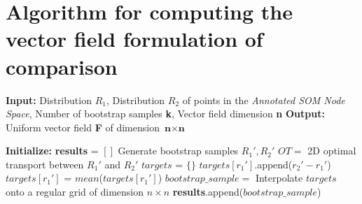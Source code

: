 \section{Algorithm for computing the vector field formulation of comparison}
\begin{algorithm}
  \caption{Computing the vector field formulation of comparison }\label{alg:bootstrap_comparison}

  \begin{algorithmic}[0]
  \State \textbf{Input:} Distribution \textbf{$R_1$}, Distribution \textbf{$R_2$} of points in the \textit{Annotated SOM Node Space}, Number of bootstrap samples \textbf{k}, Vector field dimension \textbf{n}
  \State \textbf{Output:} Uniform vector field  \textbf{F} of dimension $\textbf{n}\times \textbf{n}$

  \State \textbf{Initialize:} \textbf{results} = $[]$
       \State Generate bootstrap samples $R_1',R_2'$ 
       \State $OT= $ 2D optimal transport between $R_1'$ and $R_2'$ 
       \State {}
       \State $targets$ = $\{\}$ 
            \State $targets[r_1']$.append($r_2'-r_1'$)
       \EndFor
            \State $targets[r_1']$ = $mean$($targets[r_1']$) 
       \EndFor
       \State $bootstrap\_sample=$ Interpolate $targets$ onto a regular grid of dimension $n\times n$
       \State \textbf{results}.append($bootstrap\_sample$)

  \EndFor


\end{algorithmic}
\end{algorithm}
